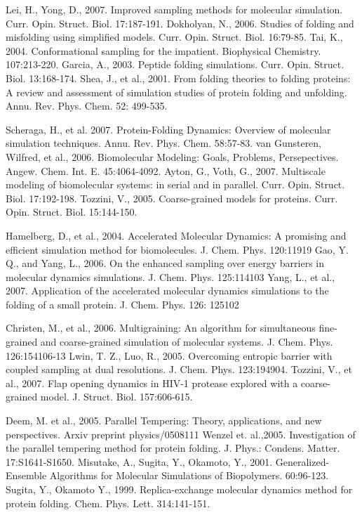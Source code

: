 \documentclass[12pt]{article}
\numberwithin{equation}{subsection}
\begin{document}
\begin{thebibliography}{1}
 Lei, H., Yong, D., 2007. Improved sampling methods for molecular simulation. Curr. Opin. Struct. Biol. 17:187-191.
 Dokholyan, N., 2006. Studies of folding and misfolding using simplified models. Curr. Opin. Struct. Biol. 16:79-85.
 Tai, K., 2004. Conformational sampling for the impatient. Biophysical Chemistry. 107:213-220.
 Garcia, A., 2003. Peptide folding simulations. Curr. Opin. Struct. Biol. 13:168-174.
  Shea, J., et al., 2001. From folding theories to folding proteins: A review and assessment of simulation studies of protein folding and unfolding. Annu. Rev. Phys. Chem. 52: 499-535.

 Scheraga, H., et al. 2007. Protein-Folding Dynamics: Overview of molecular simulation techniques. Annu. Rev. Phys. Chem. 58:57-83.
 van Gunsteren, Wilfred, et al., 2006. Biomolecular Modeling: Goals, Problems, Persepectives. Angew. Chem. Int. E. 45:4064-4092.
 Ayton, G., Voth, G., 2007. Multiscale modeling of biomolecular systems: in serial and in parallel. Curr. Opin. Struct. Biol. 17:192-198.
 Tozzini, V., 2005. Coarse-grained models for proteins. Curr. Opin. Struct. Biol. 15:144-150.

 Hamelberg, D., et al., 2004. Accelerated Molecular Dynamics:  A promising and efficient simulation method for biomolecules. J. Chem. Phys. 120:11919
 Gao, Y. Q., and Yang, L., 2006. On the enhanced sampling over energy barriers in molecular dynamics simulations. J. Chem. Phys. 125:114103
 Yang, L., et al., 2007. Application of the accelerated molecular dynamics simulations to the folding of a small protein. J. Chem. Phys. 126: 125102

 Christen, M., et al., 2006. Multigraining: An algorithm for simultaneous fine-grained and coarse-grained simulation of molecular systems. J. Chem. Phys. 126:154106-13
 Lwin, T. Z., Luo, R., 2005. Overcoming entropic barrier with coupled sampling at dual resolutions. J. Chem. Phys. 123:194904.
 Tozzini, V., et al., 2007. Flap opening dynamics in HIV-1 protease explored with a coarse-grained model. J. Struct. Biol. 157:606-615.

 Deem, M. et al., 2005. Parallel Tempering: Theory, applications, and new perspectives. Arxiv preprint physics/0508111
 Wenzel et. al.,2005. Investigation of the parallel tempering method for protein folding. J. Phys.: Condens. Matter. 17:S1641-S1650.
 Misutake, A., Sugita, Y., Okamoto, Y., 2001. Generalized-Ensemble Algorithms for Molecular Simulations of Biopolymers. 60:96-123.
 Sugita, Y., Okamoto Y., 1999. Replica-exchange molecular dynamics method for protein folding. Chem. Phys. Lett. 314:141-151.


\end{thebibliography}
\end{document}
